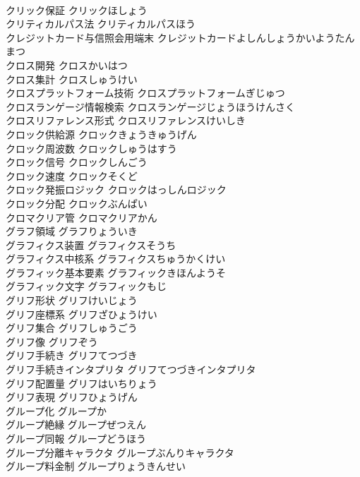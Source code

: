 \documentclass[8pt]{extreport}
\begin{document}
\begin{CJK}{UTF8}{min}
\\	クリック保証	クリックほしょう	
\\	クリティカルパス法	クリティカルパスほう	
\\	クレジットカード与信照会用端末	クレジットカードよしんしょうかいようたんまつ	
\\	クロス開発	クロスかいはつ	
\\	クロス集計	クロスしゅうけい	
\\	クロスプラットフォーム技術	クロスプラットフォームぎじゅつ	
\\	クロスランゲージ情報検索	クロスランゲージじょうほうけんさく	
\\	クロスリファレンス形式	クロスリファレンスけいしき	
\\	クロック供給源	クロックきょうきゅうげん	
\\	クロック周波数	クロックしゅうはすう	
\\	クロック信号	クロックしんごう	
\\	クロック速度	クロックそくど	
\\	クロック発振ロジック	クロックはっしんロジック	
\\	クロック分配	クロックぶんぱい	
\\	クロマクリア管	クロマクリアかん	
\\	グラフ領域	グラフりょういき	
\\	グラフィクス装置	グラフィクスそうち	
\\	グラフィクス中核系	グラフィクスちゅうかくけい	
\\	グラフィック基本要素	グラフィックきほんようそ	
\\	グラフィック文字	グラフィックもじ	
\\	グリフ形状	グリフけいじょう	
\\	グリフ座標系	グリフざひょうけい	
\\	グリフ集合	グリフしゅうごう	
\\	グリフ像	グリフぞう	
\\	グリフ手続き	グリフてつづき	
\\	グリフ手続きインタプリタ	グリフてつづきインタプリタ	
\\	グリフ配置量	グリフはいちりょう	
\\	グリフ表現	グリフひょうげん	
\\	グループ化	グループか	
\\	グループ絶縁	グループぜつえん	
\\	グループ同報	グループどうほう	
\\	グループ分離キャラクタ	グループぶんりキャラクタ	
\\	グループ料金制	グループりょうきんせい	

\end{CJK}
\end{document}

